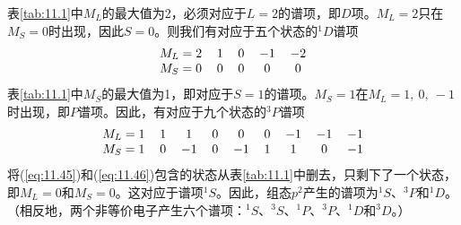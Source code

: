     表\ref{tab:11.1}中$M_L$的最大值为2，必须对应于$L=2$的谱项，即$D$项。$M_L=2$只在$M_S=0$时出现，因此$S=0$。则我们有对应于五个状态的$^1D$谱项
    \begin{equation}
        \centering
        \begin{tabular}{ccccc}
            $M_L = 2$ & $1$ & $0$ & $-1$ & $-2$ \\
            $M_S = 0$ & $0$ & $0$ & $0$ & $0$
        \end{tabular}
        \label{eq:11.45}
    \end{equation}
    表\ref{tab:11.1}中$M_S$的最大值为1，即对应于$S=1$的谱项。$M_S = 1$在$M_L = 1,\:0,\:-1$时出现，即$P$谱项。因此，有对应于九个状态的$^3P$谱项
    \begin{equation}
        \centering
        \begin{tabular}{ccccccccc}
            $M_L = 1$ & $1$ & $1$ & $0$ & $0$ & $0$ & $-1$ & $-1$ & $-1$ \\
            $M_S = 1$ & $0$ & $-1$ & $0$ & $-1$ & $1$ & $1$ & $0$ & $-1$
        \end{tabular}
        \label{eq:11.46}
    \end{equation}
    将(\ref{eq:11.45})和(\ref{eq:11.46})包含的状态从表\ref{tab:11.1}中删去，只剩下了一个状态，即$M_L = 0$和$M_S = 0$。这对应于谱项$^1S$。因此，组态$p^2$产生的谱项为$^1S$、$^3P$和$^1D$。（相反地，两个非等价电子产生六个谱项：$^1S$、$^3S$、$^1P$、$^3P$、$^1D$和$^3D$。）

